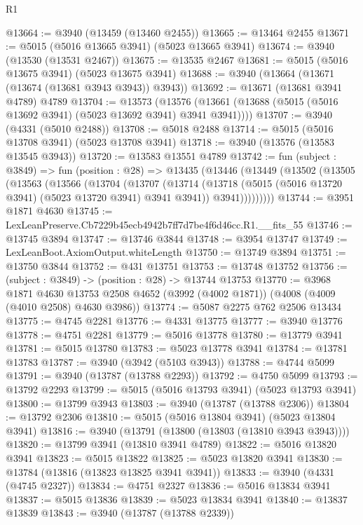 \begin{lexlean}{R1}
\begin{coremodule}
@13664 := @3940 (@13459 (@13460 @2455))
@13665 := @13464 @2455
@13671 := @5015 (@5016 @13665 @3941) (@5023 @13665 @3941)
@13674 := @3940 (@13530 (@13531 @2467))
@13675 := @13535 @2467
@13681 := @5015 (@5016 @13675 @3941) (@5023 @13675 @3941)
@13688 := @3940 (@13664 (@13671 (@13674 (@13681 @3943 @3943)) @3943))
@13692 := @13671 (@13681 @3941 @4789) @4789
@13704 := @13573
    (@13576 (@13661 (@13688 (@5015 (@5016 @13692 @3941) (@5023 @13692 @3941) @3941 @3941))))
@13707 := @3940 (@4331 (@5010 @2488))
@13708 := @5018 @2488
@13714 := @5015 (@5016 @13708 @3941) (@5023 @13708 @3941)
@13718 := @3940 (@13576 (@13583 @13545 @3943))
@13720 := @13583 @13551 @4789
@13742 := fun (subject : @3849) =>
  fun (position : @28) =>
  @13435
    (@13446
      (@13449
        (@13502
          (@13505
            (@13563
              (@13566
                (@13704
                  (@13707
                    (@13714
                      (@13718 (@5015 (@5016 @13720 @3941) (@5023 @13720 @3941) @3941 @3941))
                      @3941)))))))))
@13744 := @3951 @1871 @4630
@13745 := LexLeanPreserve.Cb7229b45ecb4942b7ff7d7be4f6d46cc.R1.__fits_55
@13746 := @13745 @3894
@13747 := @13746 @3844
@13748 := @3954 @13747
@13749 := LexLeanBoot.AxiomOutput.whiteLength
@13750 := @13749 @3894
@13751 := @13750 @3844
@13752 := @431 @13751
@13753 := @13748 @13752
@13756 := (subject : @3849) -> (position : @28) -> @13744 @13753
@13770 := @3968
    @1871
    @4630
    @13753
    @2508
    @4652
    (@3992 (@4002 @1871))
    (@4008 (@4009 (@4010 @2508) @4630 @3986))
@13774 := @5087 @2275 @762 @2506 @13434
@13775 := @4745 @2281
@13776 := @4331 @13775
@13777 := @3940 @13776
@13778 := @4751 @2281
@13779 := @5016 @13778
@13780 := @13779 @3941
@13781 := @5015 @13780
@13783 := @5023 @13778 @3941
@13784 := @13781 @13783
@13787 := @3940 (@3942 (@5103 @3943))
@13788 := @4744 @5099
@13791 := @3940 (@13787 (@13788 @2293))
@13792 := @4750 @5099
@13793 := @13792 @2293
@13799 := @5015 (@5016 @13793 @3941) (@5023 @13793 @3941)
@13800 := @13799 @3943
@13803 := @3940 (@13787 (@13788 @2306))
@13804 := @13792 @2306
@13810 := @5015 (@5016 @13804 @3941) (@5023 @13804 @3941)
@13816 := @3940 (@13791 (@13800 (@13803 (@13810 @3943 @3943))))
@13820 := @13799 @3941 (@13810 @3941 @4789)
@13822 := @5016 @13820 @3941
@13823 := @5015 @13822
@13825 := @5023 @13820 @3941
@13830 := @13784 (@13816 (@13823 @13825 @3941 @3941))
@13833 := @3940 (@4331 (@4745 @2327))
@13834 := @4751 @2327
@13836 := @5016 @13834 @3941
@13837 := @5015 @13836
@13839 := @5023 @13834 @3941
@13840 := @13837 @13839
@13843 := @3940 (@13787 (@13788 @2339))

\end{coremodule}
\end{lexlean}
